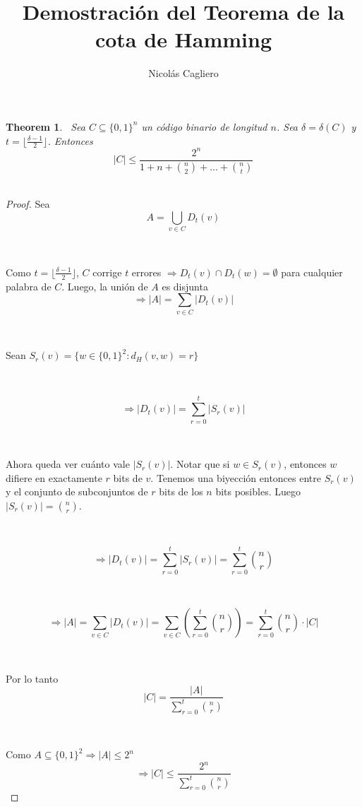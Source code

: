 \documentclass[11pt]{article}
\title{Demostración del Teorema de la cota de Hamming}
\author{Nicolás Cagliero}
\newtheorem{theorem}{Theorem}
\begin{document}
\maketitle
\begin{theorem}\par
\
Sea $C \subseteq \{0, 1\}^{n}$ un código binario de longitud $n$. Sea $\delta = \delta(C)$ y $t = \lfloor \frac{\delta - 1}{2} \rfloor$. Entonces \[|C| \le \frac{2^{n}}{1 + n + \binom{n}{2} + ... + \binom{n}{t}}\]
\

\end{theorem}

\begin{proof} Sea \[A = \bigcup_{v \in C} D_t(v)\] \par
\

Como $t = \lfloor \frac{\delta - 1}{2} \rfloor$, $C$ corrige $t$ errores $\Rightarrow D_t(v) \cap D_t(w) = \emptyset$ para cualquier palabra de $C$. Luego, la unión de $A$ es disjunta \[\Rightarrow |A| = \sum_{v \in C} |D_t(v)|\]\par
\

Sean $S_r(v) = \{w \in \{0, 1\}^{2} : d_H(v, w) = r \} $\par
\

\[\Rightarrow |D_t(v)| = \sum_{r = 0}^{t} |S_r(v)|\]\par
\

Ahora queda ver cuánto vale $|S_r(v)|$. Notar que si $w \in S_r(v)$, entonces $w$ difiere en exactamente $r$ bits de $v$. Tenemos una biyección entonces entre $S_r(v)$ y el conjunto de subconjuntos de $r$ bits de los $n$ bits posibles. Luego $|S_r(v)| = \binom{n}{r}$.\par
\

\[\Rightarrow |D_t(v)| = \sum_{r = 0}^{t} |S_r(v)| = \sum_{r = 0}^{t} \binom{n}{r}\]\par
\

\[\Rightarrow |A| = \sum_{v \in C} |D_t(v)| = \sum_{v \in C}(\sum_{r = 0}^{t} \binom{n}{r}) = \sum_{r = 0}^{t} \binom{n}{r} \cdot |C|\]\par
\

Por lo tanto \[|C| = \frac{|A|}{\displaystyle\sum_{r = 0}^{t} \binom{n}{r}}\]\par
\

Como $A \subseteq \{0, 1\}^{2} \Rightarrow |A| \le 2^{n}$ \[\Rightarrow |C| \le \frac{2^{n}}{\displaystyle\sum_{r = 0}^{t} \binom{n}{r}}\]

\end{proof}
\end{document}

